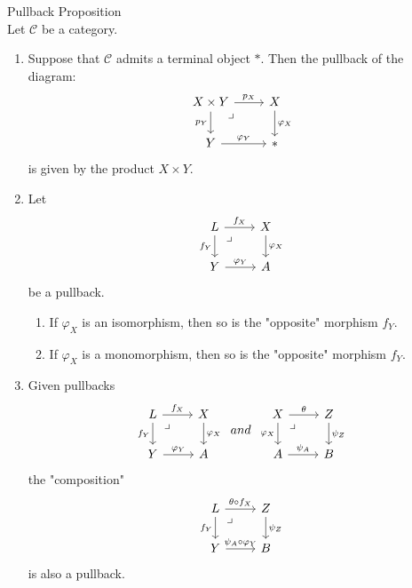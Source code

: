\begin{proposition}{Pullback Proposition}\\
Let $\mathcal{C}$ be a category.
\begin{enumerate}
    \item Suppose that $\mathcal{C}$ admits a terminal object $*$. Then the pullback of the diagram:
    $$\begin{tikzcd}
        X\times Y \arrow[r, "p_X"] \arrow[d, "p_Y"'] \arrow[dr, phantom, "\lrcorner", pos=0.15] &X \arrow[d, "\varphi_X"]\\
        Y \arrow[r, "\varphi_Y"] &*
    \end{tikzcd}$$
    is given by the product $X \times Y$.

    \item Let 
    $$\begin{tikzcd}
        L \arrow[r, "f_X"] \arrow[d, "f_Y"'] \arrow[dr, phantom, "\lrcorner", pos=0.15] &X \arrow[d, "\varphi_X"]\\
        Y \arrow[r, "\varphi_Y"] &A
    \end{tikzcd}$$
    be a pullback.
    \begin{enumerate}
        \item If $\varphi_X$ is an isomorphism, then so is the "opposite" morphism $f_Y$.
        \item If $\varphi_X$ is a monomorphism, then so is the "opposite" morphism $f_Y$.
    \end{enumerate}

    \item Given pullbacks
    $$\begin{tikzcd}
        L \arrow[r, "f_X"] \arrow[d, "f_Y"'] \arrow[dr, phantom, "\lrcorner", pos=0.15] &X \arrow[d, "\varphi_X"]\\
        Y \arrow[r, "\varphi_Y"] &A
    \end{tikzcd} \;\;and\;\; \begin{tikzcd}
        X \arrow[r, "\theta"] \arrow[d, "\varphi_X"'] \arrow[dr, phantom, "\lrcorner", pos=0.15] &Z \arrow[d, "\psi_Z"]\\
        A \arrow[r, "\psi_A"] &B
    \end{tikzcd}$$
    the "composition"
    $$\begin{tikzcd}
        L \arrow[r, "\theta \circ f_X"] \arrow[d, "f_Y"'] \arrow[dr, phantom, "\lrcorner", pos=0.15] &Z \arrow[d, "\psi_Z"]\\
        Y \arrow[r, "\psi_A \circ \varphi_Y"] &B
    \end{tikzcd}$$
    is also a pullback.
\end{enumerate}
\end{proposition}

